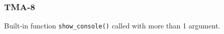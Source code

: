 \subsubsection{TMA-8}\label{sec:error_code_tma_8}

Built-in function \texttt{show\_console()} called with more than 1 argument.


